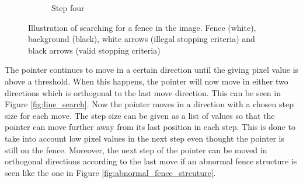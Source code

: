 \documentclass[../Head/Main.tex]{subfiles}
\begin{document}
\begin{figure}[H]
\begin{subfigure}{.24\textwidth}
        \caption{Step four}
        \label{fig:fence_search_step4}
    \end{subfigure}
    \caption{Illustration of searching for a fence in the image. Fence (white), background (black), white arrows (illegal stopping criteria) and black arrows (valid stopping criteria)}
    \label{fig:fence_search}
\end{figure}

The pointer continues to move in a certain direction until the giving pixel value is above a threshold. When this happens, the pointer will now move in either two directions which is orthogonal to the last move direction. This can be seen in Figure \ref{fig:line_search}. Now the pointer moves in a direction with a chosen step size for each move. The step size can be given as a list of values so that the pointer can move further away from its last position in each step. This is done to take into account low pixel values in the next step even thought the pointer is still on the fence. Moreover, the next step of the pointer can be moved in orthogonal directions according to the last move if an abnormal fence structure is seen like the one in Figure \ref{fig:abnormal_fence_strcuture}. 
\end{document}
